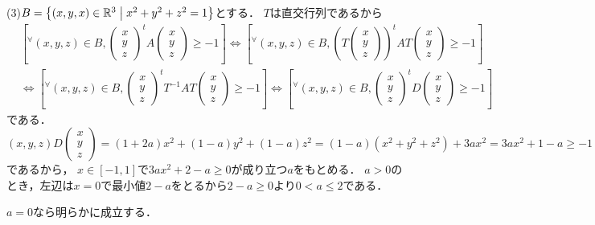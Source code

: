 \documentclass[
		book,
		head_space=20mm,
		foot_space=20mm,
		gutter=10mm,
		line_length=190mm
]{jlreq}
\begin{document}
(3)$B=\left\{ (x,y,x)\in \mathbb{R}^3\mathrel{}\middle|\mathrel{} x^2+y^2+z^2=1\right\}$とする．
$T$は直交行列であるから
\begin{align}
    &\left[ ^\forall (x,y,z)\in B,\begin{pmatrix}
x\\y\\z
\end{pmatrix}^t\! A\begin{pmatrix}
x\\y\\z
\end{pmatrix}\ge -1 \right]\Leftrightarrow \left[ ^\forall (x,y,z)\in B,\left( T\begin{pmatrix}
x\\y\\z
\end{pmatrix} \right)^t\!AT\begin{pmatrix}
x\\y\\z
\end{pmatrix}\ge -1 \right]\\&\Leftrightarrow 
\left[ ^\forall (x,y,z)\in B,\begin{pmatrix}
x\\y\\z
\end{pmatrix}^t\!T^{-1}AT\begin{pmatrix}
x\\y\\z
\end{pmatrix}\ge -1 \right]\Leftrightarrow \left[ ^\forall (x,y,z)\in B,\begin{pmatrix}
x\\y\\z
\end{pmatrix}^t\!D\begin{pmatrix}
x\\y\\z
\end{pmatrix}\ge -1 \right]
\end{align}
である．
$(x,y,z)D\begin{pmatrix}
x\\y\\z
\end{pmatrix}=(1+2a)x^2+(1-a)y^2+(1-a)z^2=(1-a)(x^2+y^2+z^2)+3ax^2=3ax^2+1-a\ge -1$であるから，
$x\in[-1,1]$で$3ax^2+2-a\ge 0$が成り立つ$a$をもとめる．
$a>0$のとき，左辺は$x=0$で最小値$2-a$をとるから$2-a\ge 0$より$0<a\le 2$である．

$a=0$なら明らかに成立する．
\end{document}
